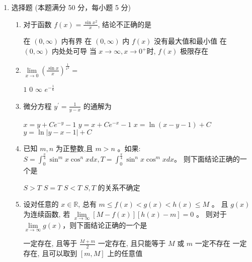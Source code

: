 

\begin{enumerate}
	\item
	选择题 (本题满分 50 分，每小题 5 分)
	\begin{enumerate}
		\item
		对于函数 $f(x)=\frac{\sin x^{2}}{x}$, 结论不正确的是  
		
		
\fourchoices
{在 $(0, \infty)$ 内有界}
{在 $(0, \infty)$ 内 $f(x)$ 没有最大值和最小值}
{在 $(0, \infty)$ 内处处可导}
{当 $x \rightarrow \infty, x \rightarrow 0^{+}$时, $f(x)$ 极限存在}

\item 
$ \lim\limits _{x \rightarrow 0}\left(\frac{\sin x}{x}\right)^{\frac{1}{x^{2}}}= $  

\fourchoices
{$ 1 $}
{$ 0 $}
{$\infty$}
{$e^{-\frac{1}{6}}$}
	
\item 
微分方程 $y^{\prime}=\frac{1}{y-x}$ 的通解为  


\fourchoices
{$x=y+C e^{-y}-1$}
{$y=x+C e^{-x}-1$}
{$x=\ln (x-y-1)+C$}
{$y=\ln |y-x-1|+C$}

\item 
已知 $m, n$ 为正整数,且 $m>n$ 。如果: $S=\int_{0}^{\frac{\pi}{4}} \sin ^{m} x \cos ^{n} x d x, T=\int_{0}^{\frac{\pi}{4}} \sin ^{n} x \cos ^{m} x d x$。 则下面结论正确的一个是  


\fourchoices
{$S>T$}
{$S=T$}
{$S<T$}
{$S, T$ 的关系不确定}

\item 
设对任意的 $x \in \mathbb{R}$, 总有 $m \leqslant f(x)<g(x)<h(x) \leqslant M$ 。 且 $g(x)$ 为连续函数, 若 $\lim\limits _{x \rightarrow \infty}[M-f(x)][h(x)-m]=0$ 。 则对于 $\lim\limits _{x \rightarrow \infty}g(x)$，则下面结论正确的一个是  


\fourchoices
{一定存在, 且等于 $\frac{M+m}{2}$}
{一定存在, 且只能等于 $M$ 或 $m$}
{一定不存在}
{一定存在, 且可以取到 $[m, M]$ 上的任意值}



\end{enumerate}
\end{enumerate}
